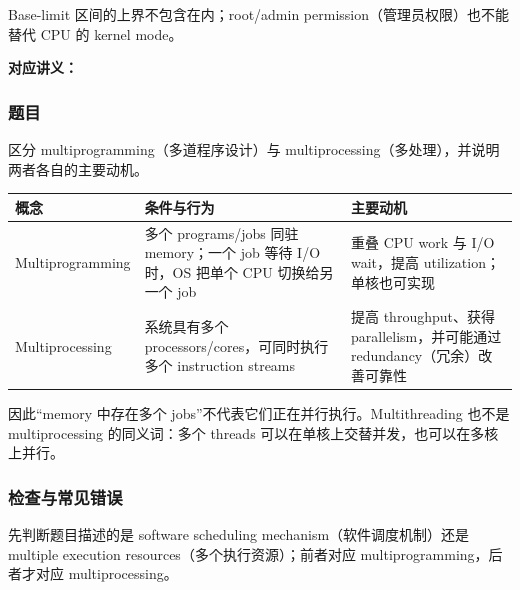 Base-limit 区间的上界不包含在内；root/admin permission（管理员权限）也不能替代 CPU 的 kernel mode。


\textbf{对应讲义：}

\subsubsection*{题目}

区分 multiprogramming（多道程序设计）与 multiprocessing（多处理），并说明两者各自的主要动机。

\begin{checkedsolution}
\begin{center}
\small
\begin{tabularx}{0.94\textwidth}{@{}>{\raggedright\arraybackslash}p{3.2cm}>{\raggedright\arraybackslash}p{4.6cm}X@{}}
  \toprule
  概念 & 条件与行为 & 主要动机 \\
  \midrule
  Multiprogramming & 多个 programs/jobs 同驻 memory；一个 job 等待 I/O 时，OS 把单个 CPU 切换给另一个 job & 重叠 CPU work 与 I/O wait，提高 utilization；单核也可实现 \\
  Multiprocessing & 系统具有多个 processors/cores，可同时执行多个 instruction streams & 提高 throughput、获得 parallelism，并可能通过 redundancy（冗余）改善可靠性 \\
  \bottomrule
\end{tabularx}
\end{center}

因此“memory 中存在多个 jobs”不代表它们正在并行执行。Multithreading 也不是 multiprocessing 的同义词：多个 threads 可以在单核上交替并发，也可以在多核上并行。
\end{checkedsolution}

\subsubsection*{检查与常见错误}

先判断题目描述的是 software scheduling mechanism（软件调度机制）还是 multiple execution resources（多个执行资源）；前者对应 multiprogramming，后者才对应 multiprocessing。
